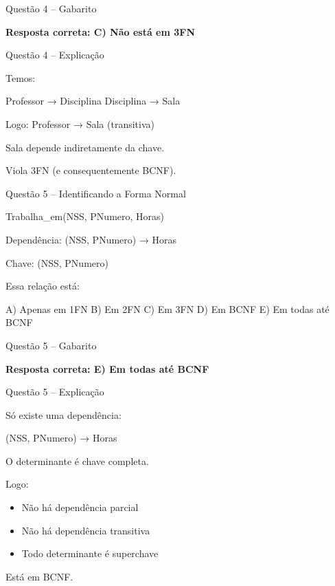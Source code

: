 \documentclass{beamer}
\begin{document}
\begin{frame}{Questão 4 – Gabarito}

\Large \textbf{Resposta correta: C) Não está em 3FN}

\end{frame}





\begin{frame}{Questão 4 – Explicação}

Temos:

Professor → Disciplina  
Disciplina → Sala  

Logo:
Professor → Sala (transitiva)

Sala depende indiretamente da chave.

Viola 3FN (e consequentemente BCNF).

\end{frame}





\begin{frame}{Questão 5 – Identificando a Forma Normal}

Trabalha\_em(NSS, PNumero, Horas)

Dependência:
(NSS, PNumero) → Horas

Chave:
(NSS, PNumero)

Essa relação está:

A) Apenas em 1FN  
B) Em 2FN  
C) Em 3FN  
D) Em BCNF  
E) Em todas até BCNF  

\end{frame}





\begin{frame}{Questão 5 – Gabarito}

\Large \textbf{Resposta correta: E) Em todas até BCNF}

\end{frame}





\begin{frame}{Questão 5 – Explicação}

Só existe uma dependência:

(NSS, PNumero) → Horas

O determinante é chave completa.

Logo:
\begin{itemize}
\item Não há dependência parcial
\item Não há dependência transitiva
\item Todo determinante é superchave
\end{itemize}

Está em BCNF.

\end{frame}
\end{document}
